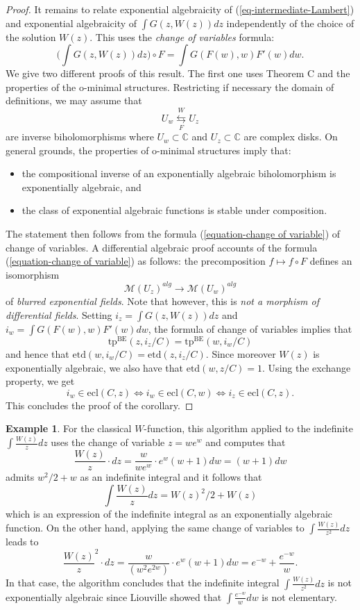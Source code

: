 \documentclass[12pt]{amsart}
\newcommand{\BE}{\mathrm{BE}}
\theoremstyle{definition}
\newtheorem{exam}[defn]{Example}
\theoremstyle{plain}
\theoremstyle{exampstyle}\newtheorem{thmx}{Theorem}
\theoremstyle{exampstyle}\newtheorem{thmxbis}{Theorem}
\begin{document}
\begin{proof}
It remains to relate exponential algebraicity of (\ref{eq-intermediate-Lambert})  and exponential algebraicity of $ \int G(z,W(z)) dz$ independently of the choice of the solution $W(z)$. This uses the {\em change of variables} formula:
\begin{equation} \label{equation-change of variable} \Big( \int G(z,W(z)) dz \Big) \circ F = \int G (F(w),w) F'(w) dw.
\end{equation} 
We give two different proofs of this result. The first one uses Theorem C and the properties of the o-minimal structures. Restricting if necessary the domain of definitions,  we may assume that
$$ U_w \underset{F}{\overset{W}{\leftrightarrows}} U_z $$
are inverse biholomorphisms where $U_w \subset \mathbb{C}$ and $U_z \subset \mathbb{C}$ are complex disks. On general grounds, the properties of o-minimal structures imply that: 
\begin{itemize}
\item the compositional inverse of an exponentially algebraic biholomorphism is exponentially algebraic, and
\item the class of exponential algebraic functions is stable under composition.
\end{itemize} 
The statement then follows from the formula  (\ref{equation-change of variable}) of change of variables. A  differential algebraic proof accounts of the formula (\ref{equation-change of variable}) as follows: the precomposition $f \mapsto f \circ F$ defines an isomorphism
$$ \mathcal M(U_z)^{alg} \rightarrow \mathcal M(U_w)^{alg} $$
of \textit{blurred exponential fields}. Note that however, this is {\em not a morphism of differential fields}. Setting $i_z = \int G(z,W(z))dz$ and $i_w = \int G(F(w),w) F'(w) dw$, the formula of change of variables implies  that $$\mathrm{tp}^{\BE}(z,i_z/C) = \mathrm{tp}^{\BE}(w,i_w/C)$$
and hence that $\mathrm{etd}(w,i_w/C) = \mathrm{etd}(z,i_z/C)$. Since moreover  $W(z)$ is exponentially algebraic, we also have that $\mathrm{etd}(w,z/C) = 1$. Using the exchange property, we get $$i_w \in \mathrm{ecl}(C,z)\Leftrightarrow i_w \in \mathrm{ecl}(C,w) \Leftrightarrow i_z \in \mathrm{ecl}(C,z).$$ This concludes the proof of the corollary.
\end{proof}

\begin{exam} 
For the classical $W$-function, this algorithm applied to the indefinite $\int \frac{W(z)} z dz$ uses the change of variable $z = we^w$ and computes that
$$ \frac{W(z)} z \cdot dz = \frac w {we^{w}} \cdot e^w(w + 1)  dw  = (w + 1)dw$$ 
admits $w^2/2 + w$ as an indefinite integral and it follows that 
$$ \int \frac{W(z)} z dz = W(z)^2/2 + W(z)$$
which is an expression of the indefinite integral as an exponentially algebraic function. On the other hand, applying the same change of variables to  $\int \frac{W(z)}{z^2} dz$ leads to 
$$ \frac{W(z)} z^2 \cdot dz = \frac w {(w^2e^{2w})} \cdot e^w(w + 1)  dw  = e^{-w} + \frac{e^{-w}} w.$$ 
In that case, the algorithm concludes that the indefinite integral $\int \frac{W(z)}{z^2} dz$ is not exponentially algebraic since Liouville showed that $\int \frac{e^{-w}} w dw$ is not elementary. 
\end{exam}
\end{document}
